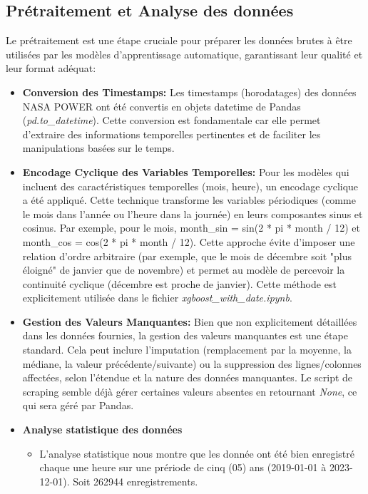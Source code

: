 \documentclass[12pt]{article}
\begin{document}
\subsection{Prétraitement et Analyse des données}
Le prétraitement est une étape cruciale pour préparer les données brutes à être utilisées par les modèles d'apprentissage automatique, garantissant leur qualité et leur format adéquat: 
\begin{itemize}[label=$\color{blue}\diamond$]
	\item \textbf{\color{blue}Conversion des Timestamps:} Les timestamps (horodatages) des données NASA POWER ont été convertis en objets datetime de Pandas (\textit{pd.to\_datetime}). Cette conversion est fondamentale car elle permet d'extraire des informations temporelles pertinentes et de faciliter les manipulations basées sur le temps.
	\item \textbf{\color{blue} Encodage Cyclique des Variables Temporelles:} Pour les modèles qui incluent des caractéristiques temporelles (mois, heure), un encodage cyclique a été appliqué. Cette technique transforme les variables périodiques (comme le mois dans l'année ou l'heure dans la journée) en leurs composantes sinus et cosinus. Par exemple, pour le mois, month\_sin = sin(2 * pi * month / 12) et month\_cos = cos(2 * pi * month / 12). Cette approche évite d'imposer une relation d'ordre arbitraire (par exemple, que le mois de décembre soit "plus éloigné" de janvier que de novembre) et permet au modèle de percevoir la continuité cyclique (décembre est proche de janvier). Cette méthode est explicitement utilisée dans le fichier \textit{xgboost\_with\_date.ipynb}.
	\item \textbf{\color{blue}Gestion des Valeurs Manquantes:} Bien que non explicitement détaillées dans les données fournies, la gestion des valeurs manquantes est une étape standard. Cela peut inclure l'imputation (remplacement par la moyenne, la médiane, la valeur précédente/suivante) ou la suppression des lignes/colonnes affectées, selon l'étendue et la nature des données manquantes. Le script de scraping semble déjà gérer certaines valeurs absentes en retournant \textit{None}, ce qui sera géré par Pandas.
	\item \textbf{\color{blue}Analyse statistique des données}
	\begin{itemize}
		\item L'analyse statistique nous montre que les donnée ont été bien enregistré chaque une heure sur une prériode de cinq (05) ans (2019-01-01 à 2023-12-01). Soit 262944 enregistrements.

\end{itemize}
\end{itemize}
\end{document}
